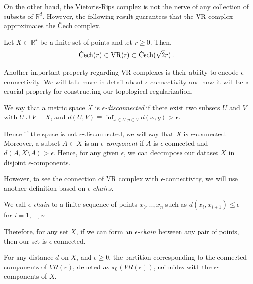 \documentclass[../main.tex]{subfiles}
\begin{document}
On the other hand, the Vietoris-Rips complex is not the nerve of any collection of subsets of $\mathbb{R}^d$. However, the following result guarantees that the VR complex approximates the \v{C}ech complex.

\begin{lemma}
\label{fig:lemaVR}
Let $X \subset \mathbb{R}^d$ be a finite set of points and let $r \geq 0$. Then,
\[
\text{\rm \v{C}ech}(r) \subset \text{\rm VR}(r) \subset \text{\rm \v{C}ech}(\sqrt{2}r)\,.
\]
\end{lemma}


Another important property regarding VR complexes is their ability to encode $\epsilon$-connectivity. We will talk more in detail about $\epsilon$-connectivity and how it will be a crucial property for constructing our topological regularization. 

\begin{definition}
We say that a metric space $X$ is \emph{$\epsilon$-disconnected} if there exist two subsets $U$ and $V$ with $U\cup V = X$, and $d(U,V)\equiv \inf_{x\in U, y\in V}d(x,y) > \epsilon$.
\end{definition}
Hence if the space is not $\epsilon$-disconnected, we will say that $X$ is $\epsilon$-connected. Moreover, a subset $A \subset X$ is an \emph{$\epsilon$-component} if $A$ is $\epsilon$-connected and $d(A, {X \setminus A}) > \epsilon$. Hence, for any given $\epsilon$, we can decompose our dataset $X$ in disjoint $\epsilon$-components.

However, to see the connection of VR complex with $\epsilon$-connectivity, we will use another definition based on \emph{$\epsilon$-chains}.

\begin{definition}
We call \emph{$\epsilon$-chain} to a finite sequence of points $x_0, .., x_n$ such as $d(x_i, x_{i+1})\leq \epsilon$ for $i=1,...,n$. 
\end{definition}

Therefore, for any set $X$, if we can form an \emph{$\epsilon$-chain} between any pair of points, then our set is $\epsilon$-connected. 

\begin{proposition}
\label{prop:connected}
For any distance $d$ on $X$, and $\epsilon \geq 0$, the partition corresponding to the connected components of $VR(\epsilon)$, denoted as $\pi_0(VR(\epsilon))$, coincides with the $\epsilon$-components of $X$.
\end{proposition}
\end{document}

